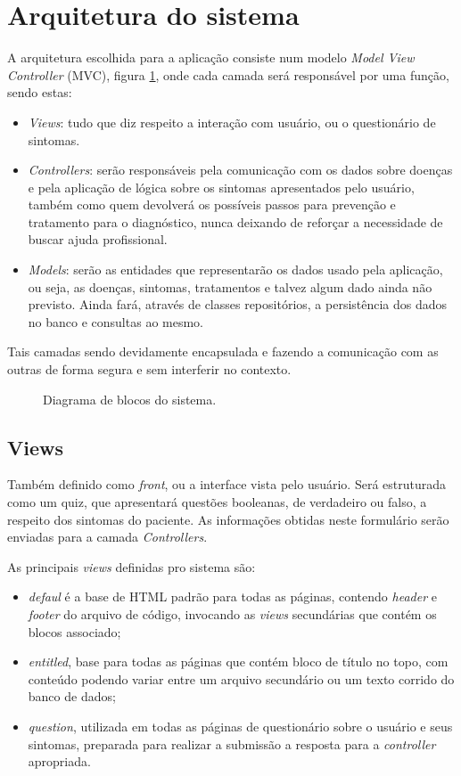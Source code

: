 \section{Arquitetura do sistema}

A arquitetura escolhida para a aplicação consiste num modelo \emph{Model View Controller} (MVC), figura \ref{fig:diagrama_bloco}, onde cada camada será responsável por uma função, sendo estas:

\begin{itemize}
    \item \emph{Views}: tudo que diz respeito a interação com usuário, ou o questionário de sintomas.
    \item \emph{Controllers}: serão responsáveis pela comunicação com os dados sobre doenças e pela aplicação de lógica sobre os sintomas apresentados pelo usuário, também como quem devolverá os possíveis passos para prevenção e tratamento para o diagnóstico, nunca deixando de reforçar a necessidade de buscar ajuda profissional.
    \item \emph{Models}: serão as entidades que representarão os dados usado pela aplicação, ou seja, as doenças, sintomas, tratamentos e talvez algum dado ainda não previsto. Ainda fará, através de classes repositórios, a persistência dos dados no banco e consultas ao mesmo.
\end{itemize}

Tais camadas sendo devidamente encapsulada e fazendo a comunicação com as outras de forma segura e sem interferir no contexto.

\begin{figure}[H]
    \centering
    
    \caption{Diagrama de blocos do sistema.}
    \label{fig:diagrama_bloco}
\end{figure}

\subsection{Views}

Também definido como \emph{front}, ou a interface vista pelo usuário. Será estruturada como um quiz, que apresentará questões booleanas, de verdadeiro ou falso, a respeito dos sintomas do paciente.
As informações obtidas neste formulário serão enviadas para a camada \emph{Controllers}.

As principais \emph{views} definidas pro sistema são:

\begin{itemize}
	\item \emph{defaul} é a base de HTML padrão para todas as páginas, contendo \emph{header} e \emph{footer} do arquivo de código, invocando as \emph{views} secundárias que contém os blocos associado;
	\item \emph{entitled}, base para todas as páginas que contém bloco de título no topo, com conteúdo podendo variar entre um arquivo secundário ou um texto corrido do banco de dados;
	\item \emph{question}, utilizada em todas as páginas de questionário sobre o usuário e seus sintomas, preparada para realizar a submissão a resposta para a \emph{controller} apropriada.
\end{itemize}

